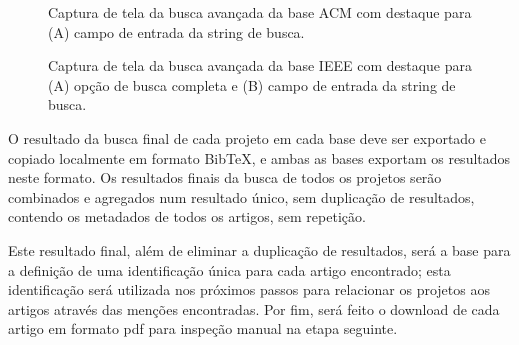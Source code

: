 \begin{figure}[h]
  \center
  \caption{Captura de tela da busca avançada da base ACM com destaque para (A) campo de entrada da string de busca.}
  \label{advanced-search-acm}
\end{figure}

\begin{figure}[h]
  \center
  \caption{Captura de tela da busca avançada da base IEEE com destaque para (A) opção de busca completa e (B) campo de entrada da string de busca.}
  \label{advanced-search-ieee}
\end{figure}

O resultado da busca final de cada projeto em cada base deve ser exportado e
copiado localmente em formato BibTeX, e ambas as bases exportam os resultados
neste formato. Os resultados finais da busca de todos os projetos serão combinados
e agregados num resultado único, sem duplicação de resultados, contendo os
metadados de todos os artigos, sem repetição.

Este resultado final, além de eliminar a duplicação de resultados, será a base
para a definição de uma identificação única para cada artigo encontrado; esta
identificação será utilizada nos próximos passos para relacionar os projetos
aos artigos através das menções encontradas. Por fim, será feito o download de cada
artigo em formato pdf para inspeção manual na etapa seguinte.

